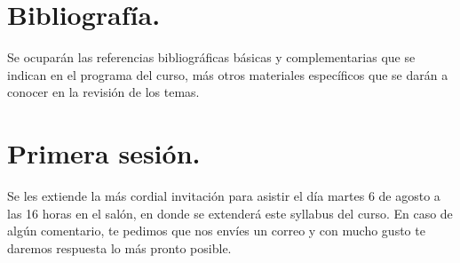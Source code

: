 \documentclass[14pt]{extarticle}
\numberwithin{equation}{section}
\begin{document}
\section{Bibliografía.}

Se ocuparán las referencias bibliográficas básicas y complementarias que se indican en el programa del curso, más otros materiales específicos que se darán a conocer en la revisión de los temas.

\section{Primera sesión.}

Se les extiende la más cordial invitación para asistir el día martes 6 de agosto a las 16 horas en el salón, en donde se extenderá este syllabus del curso. En caso de algún comentario, te pedimos que nos envíes un correo y con mucho gusto te daremos respuesta lo más pronto posible.
\end{document}
